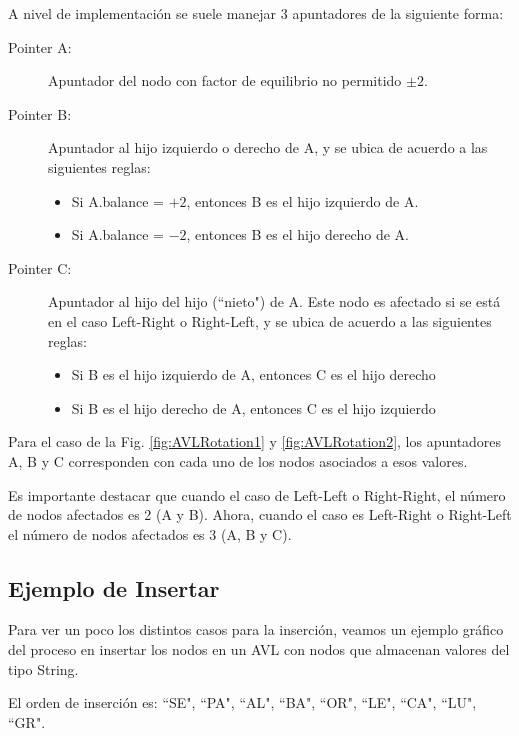 A nivel de implementación se suele manejar 3 apuntadores de la siguiente forma:
\begin{description}
\item[Pointer A:] Apuntador del nodo con factor de equilibrio no permitido $\pm 2$.
\item[Pointer B:] Apuntador al hijo izquierdo o derecho de A, y se ubica de acuerdo a las siguientes reglas:
\begin{itemize}
  \item Si A.balance = $+2$, entonces B es el hijo izquierdo de A.
  \item Si A.balance = $-2$, entonces B es el hijo derecho de A.
\end{itemize}
\item[Pointer C:] Apuntador al hijo del hijo (``nieto") de A. Este nodo es afectado si se está en el caso Left-Right o Right-Left, y se ubica de acuerdo a las siguientes reglas:
\begin{itemize}
  \item Si B es el hijo izquierdo de A, entonces C es el hijo derecho
  \item Si B es el hijo derecho de A, entonces C es el hijo izquierdo
\end{itemize}
\end{description}

Para el caso de la Fig. \ref{fig:AVLRotation1} y \ref{fig:AVLRotation2}, los apuntadores A, B y C corresponden con cada uno de los nodos asociados a esos valores.

Es importante destacar que cuando el caso de Left-Left o Right-Right, el número de nodos afectados es 2 (A y B). Ahora, cuando el caso es Left-Right o Right-Left el número de nodos afectados es 3 (A, B y C).

\subsection{Ejemplo de Insertar}

Para ver un poco los distintos casos para la inserción, veamos un ejemplo gráfico del proceso en insertar los nodos en un AVL con nodos que almacenan valores del tipo String.

El orden de inserción es: ``SE", ``PA", ``AL", ``BA", ``OR", ``LE", ``CA", ``LU", ``GR".

